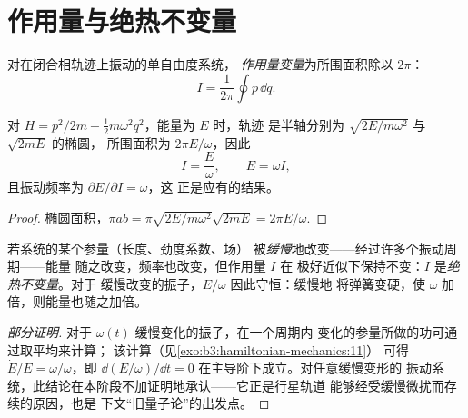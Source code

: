 \section{作用量与绝热不变量}

\begin{definition}[作用量变量]\label{def:b3:hamiltonian-mechanics:action-variable}
对在闭合相轨迹上振动的单自由度系统，
\emph{作用量变量}为所围面积除以
$2\pi$：
\[
I = \frac{1}{2\pi}\oint p\,\dd q .
\]
\end{definition}

\begin{proposition}[谐振子的作用量]\label{prop:b3:hamiltonian-mechanics:sho-action}
对 $H = p^2/2m + \tfrac12 m\omega^2q^2$，能量为 $E$ 时，轨迹
是半轴分别为 $\sqrt{2E/m\omega^2}$ 与 $\sqrt{2mE}$ 的椭圆，
所围面积为 $2\pi E/\omega$，因此
\[
I = \frac{E}{\omega} , \qquad E = \omega I ,
\]
且振动频率为 $\partial E/\partial I = \omega$，这
正是应有的结果。
\end{proposition}

\begin{proof}
椭圆面积，$\pi ab = \pi\sqrt{2E/m\omega^2}\sqrt{2mE} =
2\pi E/\omega$.
\end{proof}

\begin{proposition}[绝热不变性]\label{prop:b3:hamiltonian-mechanics:adiabatic}
若系统的某个参量（长度、劲度系数、场）
被\emph{缓慢}地改变——经过许多个振动周期——能量
随之改变，频率也改变，但作用量 $I$ 在
极好近似下保持不变：$I$ 是\emph{绝热不变量}。对于
缓慢改变的振子，$E/\omega$ 因此守恒：缓慢地
将弹簧变硬，使 $\omega$ 加倍，则能量也随之加倍。
\end{proposition}

\begin{proof}[部分证明]
对于 $\omega(t)$ 缓慢变化的振子，在一个周期内
变化的参量所做的功可通过取平均来计算；
该计算（见\cref{exo:b3:hamiltonian-mechanics:11}）
可得 $\dot E/E = \dot\omega/\omega$，即 $\dd(E/\omega)/\dd t = 0$
在主导阶下成立。对任意缓慢变形的
振动系统，此结论在本阶段不加证明地承认——它正是行星轨道
能够经受缓慢微扰而存续的原因，也是
下文“旧量子论”的出发点。
\end{proof}

